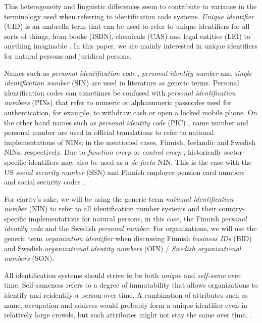 This heterogeneity and linguistic differences seem to contribute to variance in the terminology used when referring to identification code systems. \emph{Unique identifier} (UID) is an umbrella term that can be used to refer to unique identifiers for all sorts of things, from books (ISBN), chemicals (CAS) and legal entities (LEI) to anything imaginable \citep[see][]{dodge2005}. In this paper, we are mainly interested in unique identifiers for natural persons and juridical persons.

Names such as \emph{personal identification code} \citep{dodge2005}, \emph{personal identity number} \citep{alastalo2022} and \emph{single identification number} (SIN) \citep{otjacques2007} are used in literature as generic terms. Personal identification codes can sometimes be confused with \emph{personal identification numbers} (PINs) that refer to numeric or alphanumeric passcodes used for authentication, for example, to withdraw cash or open a locked mobile phone. On the other hand names such as \emph{personal identity code} (PIC) \citep{hetudvv, sund2012}, name number \citep{watson2010} and personal number \citep{scb2016} are used in official translations to refer to national implementations of NINs; in the mentioned cases, Finnish, Icelandic and Swedish NINs, respectively. Due to \emph{function creep} \citep[see][]{brensinger2021, alastalo2022} or \emph{control creep} \citep[see][]{dodge2005}, historically sector-specific identifiers may also be used as a \emph{de facto} NIN. This is the case with the US \emph{social security number} (SSN) \citep{brensinger2021} and Finnish employee pension card numbers and social security codes \citep{alastalo2022}.

For clarity's sake, we will be using the generic term \emph{national identification number} (NIN) to refer to all identification number systems and their country-specific implementations for natural persons, in this case, the Finnish \emph{personal identity code} and the Swedish \emph{personal number}. For organizations, we will use the generic term \emph{organization identifier} when discussing Finnish \emph{business IDs} (BID) and Swedish \emph{organizational identity numbers} (OIN) / \emph{Swedish organizational numbers} (SON).

All identification systems should strive to be both \emph{unique} and \emph{self-same} over time. Self-sameness refers to a degree of immutability that allows organizations to identify and reidentify a person over time. A combination of attributes such as name, occupation and address would probably form a unique identifier even in relatively large crowds, but such attributes might not stay the same over time. \citep{brensinger2021}.

